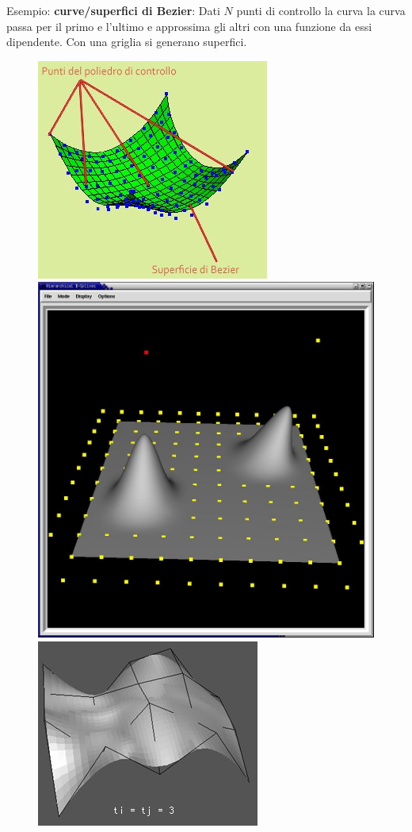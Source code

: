 \documentclass[a4paper, 10pt]{article}
\begin{document}
		Esempio: \textbf{curve/superfici di	Bezier}:
		Dati $ N $ punti di controllo la curva la curva passa per il
		primo e l'ultimo e approssima gli altri con una funzione da
		essi dipendente. Con una griglia si generano superfici.
		
		\begin{figure}[h!]
			\includegraphics[scale=0.5]{superf}
			\hspace{0.2cm}
			\includegraphics[scale=0.15]{superf1}
			\hspace{0.2cm}
			\includegraphics[scale=0.4]{superf2}
		\end{figure}
		
\end{document}
